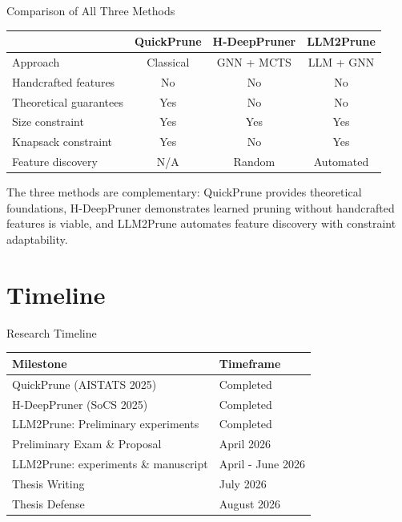 \documentclass[aspectratio=169,xcolor=dvipsnames,8pt]{beamer}
\begin{document}
\begin{frame}{Comparison of All Three Methods}
  \begin{table}
    \centering
    \small
    \begin{tabular}{lccc}
      \toprule
      & QuickPrune & H-DeepPruner & LLM2Prune \\
      \midrule
      Approach & Classical & GNN + MCTS & LLM + GNN \\
      Handcrafted features & No & No & No \\
      Theoretical guarantees & Yes & No & No \\
      Size constraint & Yes & Yes & Yes \\
      Knapsack constraint & Yes & No & Yes \\
      Feature discovery & N/A & Random  & Automated  \\
      \bottomrule
    \end{tabular}
  \end{table}

  \vspace{0.3cm}

  The three methods are complementary: QuickPrune provides theoretical
  foundations, H-DeepPruner demonstrates learned pruning without handcrafted
  features is viable, and LLM2Prune automates feature discovery with constraint
  adaptability.
\end{frame}

\section{Timeline}

\begin{frame}{Research Timeline}
  \begin{table}
    \centering
    \begin{tabular}{ll}
      \toprule
      \textbf{Milestone} & \textbf{Timeframe} \\
      \midrule
      QuickPrune (AISTATS 2025) & Completed \\
      H-DeepPruner (SoCS 2025) & Completed \\
      LLM2Prune:  Preliminary experiments  & Completed \\
      \midrule
      Preliminary Exam \& Proposal  & April 2026 \\
      LLM2Prune:  experiments \& manuscript & April - June 2026 \\
      Thesis Writing & July  2026 \\
      Thesis Defense & August 2026 \\
      \bottomrule
    \end{tabular}
  \end{table}
\end{frame}
\end{document}
